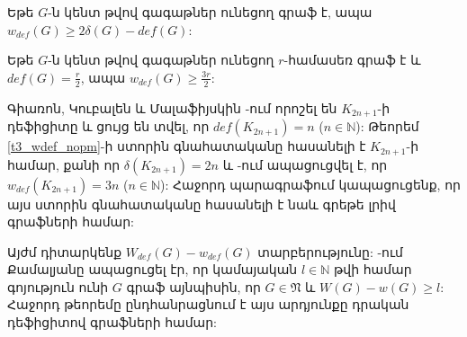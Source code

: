 \begin{corollary}
\label{c3_wdef_odd}\cite{BouchardHertzDesaulniers} Եթե $G$-ն կենտ թվով գագաթներ ունեցող գրաֆ է, ապա $w_{def}(G)\geq 2\delta(G)-def(G)$:
\end{corollary}

\begin{corollary}
\label{c3_wdef_odd_regular}\cite{BouchardHertzDesaulniers} Եթե $G$-ն կենտ թվով գագաթներ ունեցող $r$-համասեռ գրաֆ է և $def(G)=\frac{r}{2}$, ապա
$w_{def}(G)\geq \frac{3r}{2}$:
\end{corollary}

Գիառոն, Կուբալեն և Մալաֆիյսկին \cite{GiaroKubaleMalafiejski2001}-ում որոշել են $K_{2n+1}$-ի դեֆիցիտը և ցույց են տվել, որ $def(K_{2n+1})=n$ ($n\in \mathbb{N}$): Թեորեմ
\ref{t3_wdef_nopm}-ի ստորին գնահատականը հասանելի է $K_{2n+1}$-ի համար, քանի որ
$\delta(K_{2n+1})=2n$ և \cite{BouchardHertzDesaulniers}-ում ապացուցվել է, որ
$w_{def}\left(K_{2n+1}\right)=3n$ ($n\in \mathbb{N}$): Հաջորդ պարագրաֆում կապացուցենք, որ այս ստորին գնահատականը հասանելի է նաև գրեթե լրիվ գրաֆների համար:

Այժմ դիտարկենք $W_{def}(G)-w_{def}(G)$ տարբերությունը: \cite{Kamalian1990}-ում Քամալյանը ապացուցել էր, որ կամայական $l\in \mathbb{N}$ թվի համար գոյություն ունի $G$ գրաֆ այնպիսին, որ $G\in \mathfrak{N}$ և $W(G)-w(G)\geq l$: Հաջորդ թեորեմը ընդհանրացնում է այս արդյունքը դրական դեֆիցիտով գրաֆների համար:

